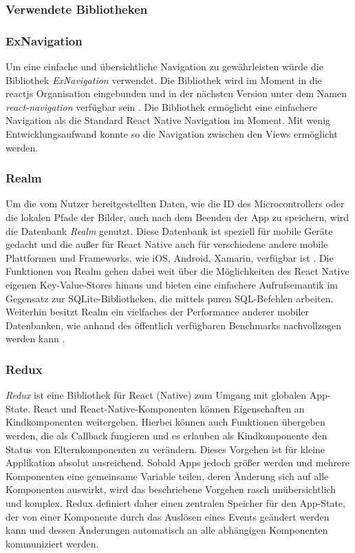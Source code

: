  
        \subsubsection{Verwendete Bibliotheken}
        
        \subsubsection*{ExNavigation}
Um eine einfache und übersichtliche  Navigation zu gewährleisten würde die Bibliothek \textit{ExNavigation} verwendet. Die Bibliothek wird im Moment in die reactjs Organisation eingebunden und in der nächsten Version unter dem Namen \textit{react-navigation} verfügbar sein \cite{Vatne_exnavigation_2017}. Die Bibliothek ermöglicht eine einfachere Navigation als die Standard React Native Navigation im Moment. Mit wenig Entwicklungsaufwand konnte so die Navigation zwischen den Views ermöglicht werden. \\

        \subsubsection*{Realm}
        Um die vom Nutzer bereitgestellten Daten, wie die ID des Microcontrollers oder die lokalen Pfade der Bilder, auch nach dem Beenden der App zu speichern, wird die Datenbank \textit{Realm} genutzt. Diese Datenbank ist speziell für mobile Geräte gedacht und die außer für React Native auch für verschiedene andere mobile Plattformen und Frameworks, wie iOS, Android, Xamarin, verfügbar ist \cite{Realm_2016}. Die Funktionen von Realm gehen dabei weit über die Möglichkeiten des React Native eigenen Key-Value-Stores hinaus und bieten eine einfachere Aufrufsemantik im Gegensatz zur SQLite-Bibliotheken, die mittels puren SQL-Befehlen arbeiten.
        Weiterhin besitzt Realm ein vielfaches der Performance anderer mobiler Datenbanken, wie anhand des öffentlich verfügbaren Benchmarks nachvollzogen werden kann \cite{Realm_Benchmark_2016}.
        
        \subsubsection*{Redux}
        \textit{Redux} ist eine Bibliothek für React (Native) zum Umgang mit globalen App-State. React und React-Native-Komponenten können Eigenschaften an Kindkomponenten weitergeben. Hierbei können auch Funktionen übergeben werden, die als Callback fungieren und es erlauben als Kindkomponente den Status von Elternkomponenten zu verändern. Dieses Vorgehen ist für kleine Applikation absolut ausreichend. Sobald Apps jedoch größer werden und mehrere Komponenten eine gemeinsame Variable teilen, deren Änderung sich auf alle Komponenten auswirkt, wird das beschriebene Vorgehen rasch unübersichtlich und komplex. Redux definiert daher einen zentralen Speicher für den App-State, der von einer Komponente durch das Auslösen eines Events geändert werden kann und dessen Änderungen automatisch an alle abhängigen Komponenten kommuniziert werden.
        
